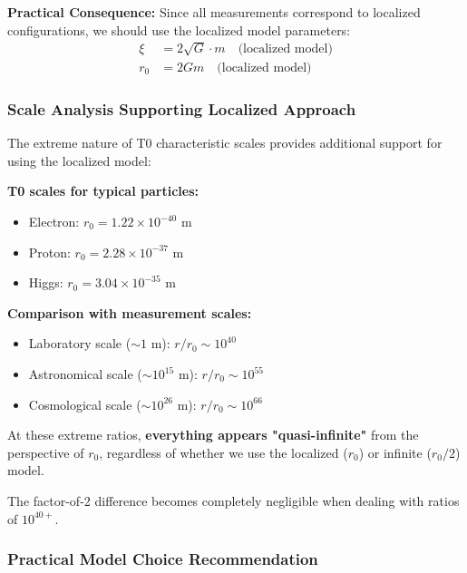 \documentclass[12pt,a4paper]{article}
\begin{document}
\textbf{Practical Consequence:}
Since all measurements correspond to localized configurations, we should use the localized model parameters:
\begin{align}
	\xi &= 2\sqrt{G} \cdot m \quad \text{(localized model)} \\
	r_0 &= 2Gm \quad \text{(localized model)}
\end{align}

\subsubsection{Scale Analysis Supporting Localized Approach}
\label{subsubsec:scale_analysis_localized}

The extreme nature of T0 characteristic scales provides additional support for using the localized model:

\textbf{T0 scales for typical particles:}
\begin{itemize}
	\item Electron: $r_0 = 1.22 \times 10^{-40}$ m
	\item Proton: $r_0 = 2.28 \times 10^{-37}$ m  
	\item Higgs: $r_0 = 3.04 \times 10^{-35}$ m
\end{itemize}

\textbf{Comparison with measurement scales:}
\begin{itemize}
	\item Laboratory scale ($\sim 1$ m): $r/r_0 \sim 10^{40}$
	\item Astronomical scale ($\sim 10^{15}$ m): $r/r_0 \sim 10^{55}$
	\item Cosmological scale ($\sim 10^{26}$ m): $r/r_0 \sim 10^{66}$
\end{itemize}

\begin{tcolorbox}[colback=blue!5!white,colframe=blue!75!black,title=Scale Hierarchy Insight]
	At these extreme ratios, \textbf{everything appears "quasi-infinite"} from the perspective of $r_0$, regardless of whether we use the localized ($r_0$) or infinite ($r_0/2$) model.
	
	The factor-of-2 difference becomes completely negligible when dealing with ratios of $10^{40+}$.
\end{tcolorbox}

\subsubsection{Practical Model Choice Recommendation}  
\label{subsubsec:model_choice_recommendation}
\end{document}
